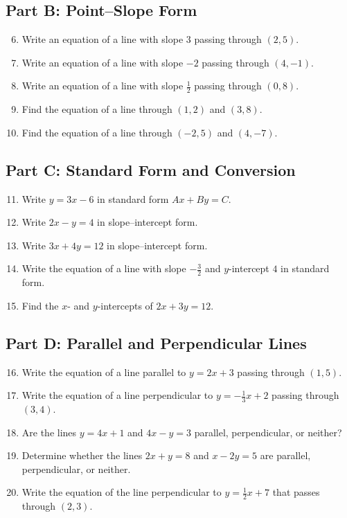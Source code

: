 \documentclass[14pt]{extarticle}
\begin{document}
\subsection*{Part B: Point–Slope Form}
\begin{enumerate}
    \setcounter{enumi}{5}
    \item Write an equation of a line with slope \(3\) passing through \((2, 5)\).
    \item Write an equation of a line with slope \(-2\) passing through \((4, -1)\).
    \item Write an equation of a line with slope \(\tfrac{1}{2}\) passing through \((0, 8)\).
    \item Find the equation of a line through \((1, 2)\) and \((3, 8)\).
    \item Find the equation of a line through \((-2, 5)\) and \((4, -7)\).
\end{enumerate}

\subsection*{Part C: Standard Form and Conversion}
\begin{enumerate}
    \setcounter{enumi}{10}
    \item Write \(y = 3x - 6\) in standard form \(Ax + By = C\).
    \item Write \(2x - y = 4\) in slope–intercept form.
    \item Write \(3x + 4y = 12\) in slope–intercept form.
    \item Write the equation of a line with slope \(-\tfrac{3}{2}\) and \(y\)-intercept \(4\) in standard form.
    \item Find the \(x\)- and \(y\)-intercepts of \(2x + 3y = 12\).
\end{enumerate}

\subsection*{Part D: Parallel and Perpendicular Lines}
\begin{enumerate}
    \setcounter{enumi}{15}
    \item Write the equation of a line parallel to \(y = 2x + 3\) passing through \((1, 5)\).
    \item Write the equation of a line perpendicular to \(y = -\tfrac{1}{3}x + 2\) passing through \((3, 4)\).
    \item Are the lines \(y = 4x + 1\) and \(4x - y = 3\) parallel, perpendicular, or neither?
    \item Determine whether the lines \(2x + y = 8\) and \(x - 2y = 5\) are parallel, perpendicular, or neither.
    \item Write the equation of the line perpendicular to \(y = \tfrac{1}{2}x + 7\) that passes through \((2, 3)\).
\end{enumerate}
\end{document}
